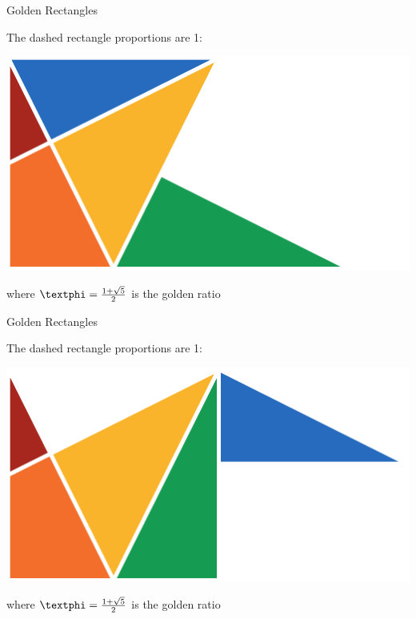 \documentclass[14pt]{beamer}
\begin{document}
    \begin{frame}{Golden Rectangles}
        \begin{center}
            The dashed rectangle proportions are 1:\textphi
        \end{center}
        \hspace{4.1em} \includegraphics[scale=1.0]{figures/figure030e.pdf} \\
        \begin{center}
            where $\text{\textphi} =\tfrac{1+\sqrt{5}}{2}$ is the golden ratio
        \end{center}
    \end{frame}


    \begin{frame}{Golden Rectangles}
        \begin{center}
            The dashed rectangle proportions are 1:\textphi
        \end{center}
        \hspace{4.1em} \includegraphics[scale=1.0]{figures/figure030f.pdf} \\
        \begin{center}
            where $\text{\textphi} =\tfrac{1+\sqrt{5}}{2}$ is the golden ratio
        \end{center}
    \end{frame}
\end{document}
